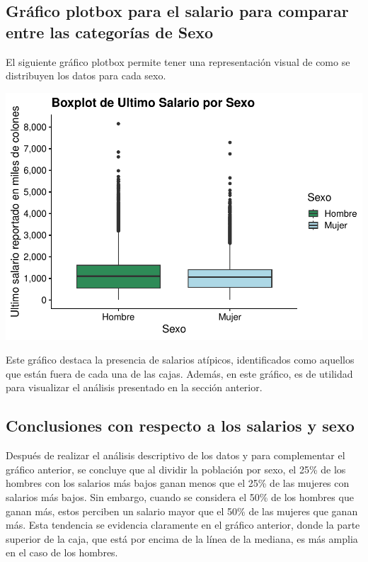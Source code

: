 \documentclass[
]{article}
\begin{document}
\hypertarget{gruxe1fico-plotbox-para-el-salario-para-comparar-entre-las-categoruxedas-de-sexo}{%
\subsection{Gráfico plotbox para el salario para comparar entre las
categorías de
Sexo}\label{gruxe1fico-plotbox-para-el-salario-para-comparar-entre-las-categoruxedas-de-sexo}}

El siguiente gráfico plotbox permite tener una representación visual de
como se distribuyen los datos para cada sexo.

\includegraphics{Tarea1_files/figure-latex/unnamed-chunk-10-1.pdf}

Este gráfico destaca la presencia de salarios atípicos, identificados
como aquellos que están fuera de cada una de las cajas. Además, en este
gráfico, es de utilidad para visualizar el análisis presentado en la
sección anterior.

\hypertarget{conclusiones-con-respecto-a-los-salarios-y-sexo}{%
\subsection{Conclusiones con respecto a los salarios y
sexo}\label{conclusiones-con-respecto-a-los-salarios-y-sexo}}

Después de realizar el análisis descriptivo de los datos y para
complementar el gráfico anterior, se concluye que al dividir la
población por sexo, el 25\% de los hombres con los salarios más bajos
ganan menos que el 25\% de las mujeres con salarios más bajos. Sin
embargo, cuando se considera el 50\% de los hombres que ganan más, estos
perciben un salario mayor que el 50\% de las mujeres que ganan más. Esta
tendencia se evidencia claramente en el gráfico anterior, donde la parte
superior de la caja, que está por encima de la línea de la mediana, es
más amplia en el caso de los hombres.
\end{document}
